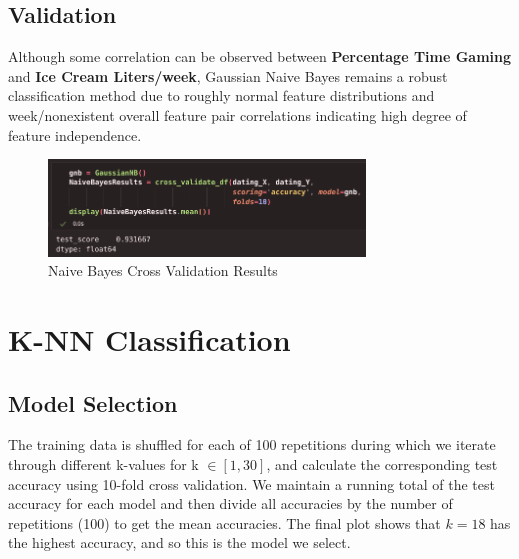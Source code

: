 \documentclass{article}
\begin{document}
    \subsection*{Validation}

    Although some correlation can be observed between \textbf{Percentage Time Gaming} and
    \textbf{Ice Cream Liters/week}, Gaussian Naive Bayes remains a robust classification method due to
    roughly normal feature distributions and week/nonexistent overall feature pair correlations indicating
    high degree of feature independence.

    \begin{figure}[H]
        \centering
        \includegraphics[width=0.75\textwidth, height=0.15\textheight]{NB_results.png}
        \caption{\small{Naive Bayes Cross Validation Results}}
    \end{figure}

\section*{K-NN Classification}

    \subsection*{Model Selection}

    The training data is shuffled for each of 100 repetitions during which we iterate through
    different k-values for k $\in [1,30]$, and calculate the corresponding test accuracy
    using 10-fold cross validation. We maintain a running total of the test accuracy for
    each model and then divide all accuracies by the number of repetitions (100) to get the
    mean accuracies. The final plot shows that $k=18$ has the highest accuracy, and so this
    is the model we select.
    
\end{document}
